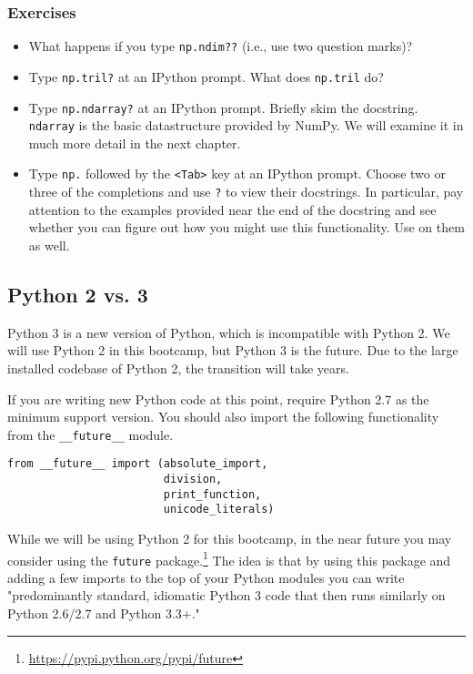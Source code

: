 \subsubsection{Exercises}
\begin{itemize}
\item What happens if you type \texttt{np.ndim??} (i.e., use two question marks)?
\item Type \texttt{np.tril?} at an IPython prompt. What does \texttt{np.tril} do?
\item Type \texttt{np.ndarray?} at an IPython prompt. Briefly skim the docstring.
  \texttt{ndarray} is the basic datastructure provided by NumPy. We will examine it
  in much more detail in the next chapter.
\item Type \texttt{np.} followed by the \texttt{<Tab>} key at an IPython prompt.
  Choose two or three of the completions and use \texttt{?} to view their
  docstrings.  In particular, pay attention to the examples provided near
  the end of the docstring and see whether you can figure out how you might
  use this functionality.  Use on them as well.
\end{itemize}

\subsection{Python 2 vs. 3}

Python 3 is a new version of Python, which is incompatible with Python 2.
We will use Python 2 in this bootcamp, but Python 3 is the future.  Due
to the large installed codebase of Python 2, the transition will take years.

If you are writing new Python code at this point, require Python 2.7 as the
minimum support version.  You should also import the following functionality
from the \texttt{\_\_future\_\_} module.

\begin{verbatim}
from __future__ import (absolute_import,
                        division,
                        print_function,
                        unicode_literals)
\end{verbatim}

While we will be using Python 2 for this bootcamp, in the near future you may
consider using the \texttt{future}
package.\footnote{\url{https://pypi.python.org/pypi/future}} The idea is that
by using this package and adding a few imports to the top of your Python
modules you can write "predominantly standard, idiomatic Python 3 code that
then runs similarly on Python 2.6/2.7 and Python 3.3+."

